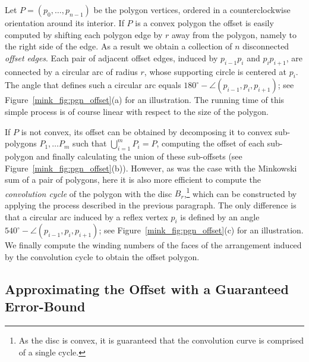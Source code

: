 Let $P = \left( p_0, \ldots, p_{n - 1} \right)$ be the polygon vertices,
ordered in a counterclockwise orientation around its interior. 
If $P$ is a convex polygon the offset is easily computed by
shifting each polygon edge by $r$ away from the polygon, namely to
the right side of the edge. As a result we obtain a collection of
$n$ disconnected \emph{offset edges}. Each pair of adjacent offset
edges, induced by $p_{i-1} p_i$ and $p_i p_{i+1}$, are connected
by a circular arc of radius $r$, whose supporting circle is
centered at $p_i$. The angle that defines such a circular arc
equals $180^{\circ} - \angle (p_{i-1}, p_i, p_{i+1})$; see
Figure~\ref{mink_fig:pgn_offset}(a) for an illustration. The running
time of this simple process is of course linear with respect to
the size of the polygon.

If $P$ is not convex, its offset can be obtained by decomposing it
to convex sub-polygons $P_1, \ldots P_m$ such that
$\bigcup_{i=1}^{m}{P_i} = P$, computing the offset of each
sub-polygon and finally calculating the union of these sub-offsets
(see Figure~\ref{mink_fig:pgn_offset}(b)). However, as was the case with
the Minkowski sum of a pair of polygons, here it is also more
efficient to compute the \emph{convolution cycle} of the polygon
with the disc $B_r$,\footnote{As the disc is convex, it is guaranteed
that the convolution curve is comprised of a single cycle.} which can be
constructed by applying the process described in the previous
paragraph. The only difference is that a circular arc induced by a
reflex vertex $p_i$ is defined by an angle $540^{\circ} - \angle
(p_{i-1}, p_i, p_{i+1})$; see Figure~\ref{mink_fig:pgn_offset}(c) for an
illustration. We finally compute the winding numbers of the faces of the
arrangement induced by the convolution cycle to obtain the offset
polygon.

\subsection{Approximating the Offset with a Guaranteed Error-Bound\label{mink_ssec:approx_offset}}

